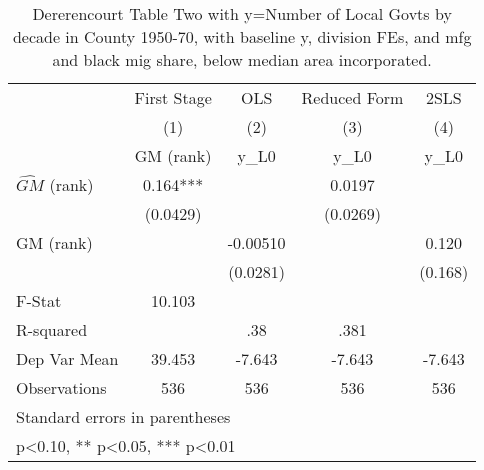 \begin{table}[htbp]\centering
\def\sym#1{\ifmmode^{#1}\else\(^{#1}\)\fi}
\caption{Dererencourt Table Two with y=Number of Local Govts by decade in County 1950-70, with baseline y, division FEs, and mfg and black mig share, below median area incorporated.}
\begin{tabular}{l*{4}{c}}
\toprule
                    & First Stage   &         OLS   &Reduced Form   &        2SLS   \\
                    &\multicolumn{1}{c}{(1)}&\multicolumn{1}{c}{(2)}&\multicolumn{1}{c}{(3)}&\multicolumn{1}{c}{(4)}\\
                    &\multicolumn{1}{c}{GM  (rank)}&\multicolumn{1}{c}{y\_L0}&\multicolumn{1}{c}{y\_L0}&\multicolumn{1}{c}{y\_L0}\\
\midrule
$\hat{GM}$ (rank)   &       0.164***&               &      0.0197   &               \\
                    &    (0.0429)   &               &    (0.0269)   &               \\
\addlinespace
GM  (rank)          &               &    -0.00510   &               &       0.120   \\
                    &               &    (0.0281)   &               &     (0.168)   \\
\midrule
F-Stat              &      10.103   &               &               &               \\
R-squared           &               &         .38   &        .381   &               \\
Dep Var Mean        &      39.453   &      -7.643   &      -7.643   &      -7.643   \\
Observations        &         536   &         536   &         536   &         536   \\
\bottomrule
\multicolumn{5}{l}{\footnotesize Standard errors in parentheses}\\
\multicolumn{5}{l}{\footnotesize * p<0.10, ** p<0.05, *** p<0.01}\\
\end{tabular}
\end{table}
